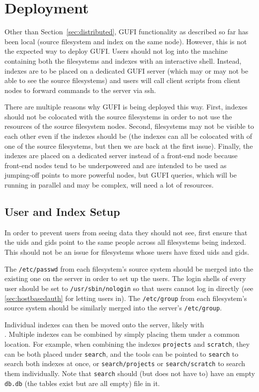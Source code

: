 \section{Deployment}
\label{sec:deploy}
Other than Section~\ref{sec:distributed}, GUFI functionality as
described so far has been local (source filesystem and index on the
same node). However, this is not the expected way to deploy
GUFI. Users should not log into the machine containing both the
filesystems and indexes with an interactive shell. Instead, indexes
are to be placed on a dedicated GUFI server (which may or may not be
able to see the source filesystems) and users will call client scripts
from client nodes to forward commands to the server via ssh.

There are multiple reasons why GUFI is being deployed this way. First,
indexes should not be colocated with the source filesystems in order
to not use the resources of the source filesystem nodes. Second,
filesystems may not be visible to each other even if the indexes
should be (the indexes can all be colocated with of one of the source
filesystems, but then we are back at the first issue). Finally, the
indexes are placed on a dedicated server instead of a front-end node
because front-end nodes tend to be underpowered and are intended to be
used as jumping-off points to more powerful nodes, but GUFI queries,
which will be running in parallel and may be complex, will need a lot
of resources.

\subsection{User and Index Setup}
In order to prevent users from seeing data they should not see, first
ensure that the uids and gids point to the same people across all
filesystems being indexed. This should not be an issue for filesystems
whose users have fixed uids and gids.

The \texttt{/etc/passwd} from each filesystem's source system should
be merged into the existing one on the server in order to set up
the users. The login shells of every user should be set to
\texttt{/usr/sbin/nologin} so that users cannot log in directly (see
\ref{sec:hostbasedauth} for letting users in). The \texttt{/etc/group}
from each filesystem's source system should be similarly merged into
the server's \texttt{/etc/group}.

Individual indexes can then be moved onto the server, likely with
\\\gufitraceindex. Multiple indexes can be combined by simply placing
them under a common location. For example, when combining the indexes
\texttt{projects} and \texttt{scratch}, they can be both placed under
\texttt{search}, and the tools can be pointed to \texttt{search} to
search both indexes at once, or \texttt{search/projects} or
\texttt{search/scratch} to search them individually. Note that
\texttt{search} should (but does not have to) have an empty
\texttt{db.db} (the tables exist but are all empty) file in it.

